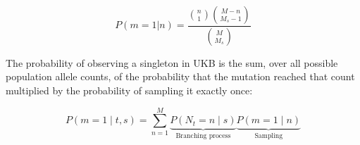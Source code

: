 \documentclass{article}
\begin{document}
\begin{equation}
    P(m=1 | n) = \frac{\binom{n}{1} \binom{M-n}{M_s - 1}}{\binom{M}{M_s}}
\end{equation}

The probability of observing a singleton in UKB is the sum, over all possible population allele counts, of the probability that the mutation reached that count multiplied by the probability of sampling it exactly once:


\begin{equation}
    P(m=1\mid t,s)
    =
    \sum_{n=1}^{M}
    \underbrace{P(N_t=n\mid s)}_{\text{Branching process}}
    \underbrace{P(m=1\mid n)}_{\text{Sampling}}
\end{equation}
\end{document}
